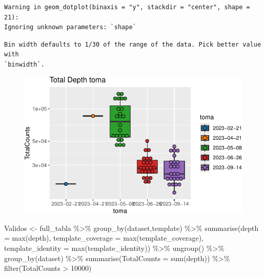 \documentclass[
  letterpaper,
  DIV=11,
  numbers=noendperiod]{scrartcl}
\newenvironment{Shaded}{\begin{snugshade}}{\end{snugshade}}
\newcommand{\AttributeTok}[1]{\textcolor[rgb]{0.40,0.45,0.13}{#1}}
\newcommand{\DecValTok}[1]{\textcolor[rgb]{0.68,0.00,0.00}{#1}}
\newcommand{\FunctionTok}[1]{\textcolor[rgb]{0.28,0.35,0.67}{#1}}
\newcommand{\NormalTok}[1]{\textcolor[rgb]{0.00,0.23,0.31}{#1}}
\newcommand{\OtherTok}[1]{\textcolor[rgb]{0.00,0.23,0.31}{#1}}
\newcommand{\SpecialCharTok}[1]{\textcolor[rgb]{0.37,0.37,0.37}{#1}}
\begin{document}
\begin{verbatim}
Warning in geom_dotplot(binaxis = "y", stackdir = "center", shape = 21):
Ignoring unknown parameters: `shape`
\end{verbatim}

\begin{verbatim}
Bin width defaults to 1/30 of the range of the data. Pick better value with
`binwidth`.
\end{verbatim}

\begin{figure}[H]

{\centering \includegraphics{InformeNeiker_files/figure-pdf/unnamed-chunk-5-5.pdf}

}

\end{figure}

\begin{Shaded}
\begin{Highlighting}[]
\NormalTok{Validos }\OtherTok{\textless{}{-}}\NormalTok{ full\_tabla }\SpecialCharTok{\%\textgreater{}\%} 
  \FunctionTok{group\_by}\NormalTok{(dataset,template) }\SpecialCharTok{\%\textgreater{}\%} 
  \FunctionTok{summarise}\NormalTok{(}\AttributeTok{depth =} \FunctionTok{max}\NormalTok{(depth), }
            \AttributeTok{template\_coverage =} \FunctionTok{max}\NormalTok{(template\_coverage), }
            \AttributeTok{template\_identity =} \FunctionTok{max}\NormalTok{(template\_identity)) }\SpecialCharTok{\%\textgreater{}\%} 
  \FunctionTok{ungroup}\NormalTok{() }\SpecialCharTok{\%\textgreater{}\%} 
  \FunctionTok{group\_by}\NormalTok{(dataset) }\SpecialCharTok{\%\textgreater{}\%} 
  \FunctionTok{summarise}\NormalTok{(}\AttributeTok{TotalCounts =} \FunctionTok{sum}\NormalTok{(depth)) }\SpecialCharTok{\%\textgreater{}\%}
  \FunctionTok{filter}\NormalTok{(TotalCounts }\SpecialCharTok{\textgreater{}} \DecValTok{10000}\NormalTok{)}
\end{Highlighting}
\end{Shaded}
\end{document}
